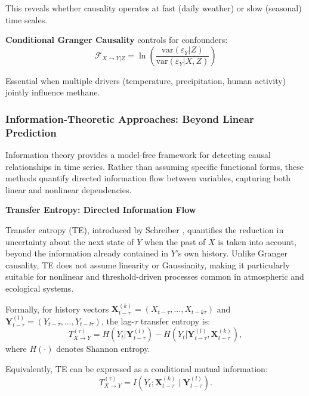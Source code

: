 This reveals whether causality operates at fast (daily weather) or slow (seasonal) time scales.

\textbf{Conditional Granger Causality} controls for confounders:
\begin{equation}
\mathcal{F}_{X \rightarrow Y|Z} = \ln\left(\frac{\text{var}(\varepsilon_Y | Z)}{\text{var}(\varepsilon_Y | X,Z)}\right)
\end{equation}

Essential when multiple drivers (temperature, precipitation, human activity) jointly influence methane.

\subsubsection{Information-Theoretic Approaches: Beyond Linear Prediction}

Information theory provides a model-free framework for detecting causal relationships in time series. Rather than assuming specific functional forms, these methods quantify directed information flow between variables, capturing both linear and nonlinear dependencies.

\textbf{Transfer Entropy: Directed Information Flow}

Transfer entropy (TE), introduced by Schreiber \cite{Schreiber2000}, quantifies the reduction in uncertainty about the next state of $Y$ when the past of $X$ is taken into account, beyond the information already contained in $Y$'s own history. Unlike Granger causality, TE does not assume linearity or Gaussianity, making it particularly suitable for nonlinear and threshold-driven processes common in atmospheric and ecological systems.

Formally, for history vectors $\mathbf{X}^{(k)}_{t-\tau}=(X_{t-\tau},...,X_{t-k\tau})$ and $\mathbf{Y}^{(l)}_{t-\tau}=(Y_{t-\tau},...,Y_{t-l\tau})$, the lag-$\tau$ transfer entropy is:
\begin{equation}
T_{X \rightarrow Y}^{(\tau)} = H(Y_t | \mathbf{Y}^{(l)}_{t-\tau}) - H(Y_t | \mathbf{Y}^{(l)}_{t-\tau},\mathbf{X}^{(k)}_{t-\tau}),
\end{equation}
where $H(\cdot)$ denotes Shannon entropy. 

Equivalently, TE can be expressed as a conditional mutual information:
\begin{equation}
T_{X \rightarrow Y}^{(\tau)} = I(Y_t; \mathbf{X}^{(k)}_{t-\tau} \mid \mathbf{Y}^{(l)}_{t-\tau}).
\end{equation}

